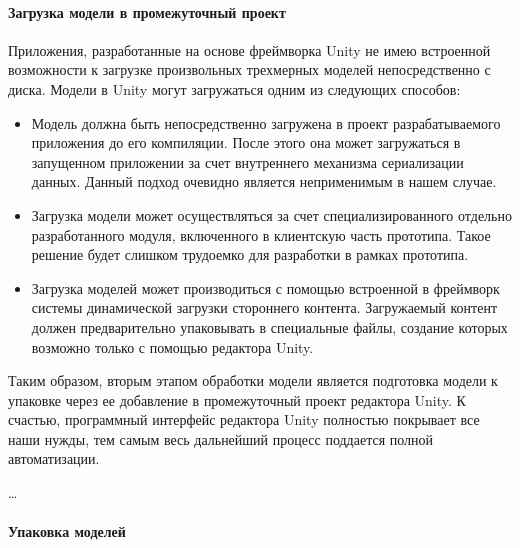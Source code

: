 \paragraph{Загрузка модели в промежуточный проект}

Приложения, разработанные на основе фреймворка Unity не имею встроенной возможности
к загрузке произвольных трехмерных моделей непосредственно с диска.
Модели в Unity могут загружаться одним из следующих способов:

\begin{itemize}
    \item {
        Модель должна быть непосредственно загружена в проект
        разрабатываемого приложения до его компиляции.
        После этого она может загружаться в запущенном приложении
        за счет внутреннего механизма сериализации данных.
        Данный подход очевидно является неприменимым в нашем случае.
    }
    \item {
        Загрузка модели может осуществляться за счет
        специализированного отдельно разработанного модуля,
        включенного в клиентскую часть прототипа.
        Такое решение будет слишком трудоемко для разработки в рамках прототипа. 
    }
    \item {
        Загрузка моделей может производиться с помощью встроенной в фреймворк
        системы динамической загрузки стороннего контента.
        Загружаемый контент должен предварительно упаковывать
        в специальные файлы, создание которых возможно только
        с помощью редактора Unity.
    }
\end{itemize}

Таким образом, вторым этапом обработки модели является подготовка модели к упаковке
через ее добавление в промежуточный проект редактора Unity.
К счастью, программный интерфейс редактора Unity полностью покрывает
все наши нужды, тем самым весь дальнейший процесс поддается полной автоматизации.

\dots

\paragraph{Упаковка моделей}


